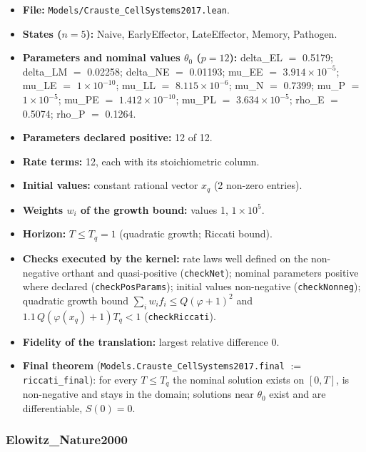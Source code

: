 \begin{itemize}\itemsep0pt\small
\item \textbf{File:} \texttt{Models/Crauste\_CellSystems2017.lean}.
\item \textbf{States ($n=5$):} Naive, EarlyEffector, LateEffector, Memory, Pathogen.
\item \textbf{Parameters and nominal values $\theta_0$ ($p=12$):} delta\_EL $=$ 0.5179; delta\_LM $=$ 0.02258; delta\_NE $=$ 0.01193; mu\_EE $=$ $3.914\times10^{-5}$; mu\_LE $=$ $1\times10^{-10}$; mu\_LL $=$ $8.115\times10^{-6}$; mu\_N $=$ 0.7399; mu\_P $=$ $1\times10^{-5}$; mu\_PE $=$ $1.412\times10^{-10}$; mu\_PL $=$ $3.634\times10^{-5}$; rho\_E $=$ 0.5074; rho\_P $=$ 0.1264.
\item \textbf{Parameters declared positive:} 12 of 12.
\item \textbf{Rate terms:} 12, each with its stoichiometric column.
\item \textbf{Initial values:} constant rational vector $x_q$ (2 non-zero entries).
\item \textbf{Weights $w_i$ of the growth bound:} values 1, $1\times10^{5}$.
\item \textbf{Horizon:} $T\le T_q=1$ (quadratic growth; Riccati bound).
\item \textbf{Checks executed by the kernel:} rate laws well defined on the non-negative orthant and quasi-positive (\texttt{checkNet}); nominal parameters positive where declared (\texttt{checkPosParams}); initial values non-negative (\texttt{checkNonneg}); quadratic growth bound $\sum_iw_if_i\le Q(\varphi+1)^2$ and $1.1\,Q(\varphi(x_q)+1)T_q<1$ (\texttt{checkRiccati}).
\item \textbf{Fidelity of the translation:} largest relative difference 0.
\item \textbf{Final theorem} (\texttt{Models.Crauste\_CellSystems2017.final} $:=$ \texttt{riccati\_final}): for every $T\le T_q$ the nominal solution exists on $[0,T]$, is non-negative and stays in the domain; solutions near $\theta_0$ exist and are differentiable, $S(0)=0$.
\end{itemize}

\subsubsection*{Elowitz\_Nature2000}

